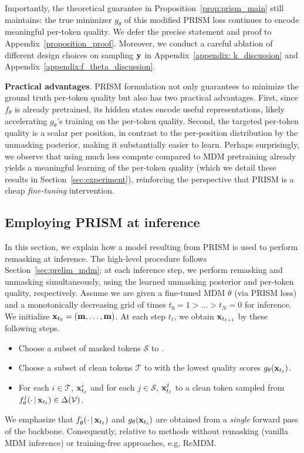 Importantly, the theoretical guarantee in Proposition~\ref{prop:prism_main} still maintains: the true minimizer $g_\theta$ of this modified PRISM loss continues to encode meaningful per-token quality. We defer the precise statement and proof to Appendix~\ref{proposition_proof}. Moreover, we conduct a careful ablation of different design choices on sampling ${\mathbf{y}}$ in Appendix~\ref{appendix: k_discussion} and Appendix~\ref{appendix:f_theta_discussion}.


\textbf{Practical advantages}. PRISM formulation not only guarantees to minimize the ground truth per-token quality but also has two practical advantages. First, since $f_\theta$ is already pretrained, its hidden states encode useful representations, likely accelerating $g_\theta$'s training on the per-token quality. Second, the targeted per-token quality is a scalar per position, in contrast to the per-position distribution by the unmasking posterior, making it substantially easier to learn. Perhaps surprisingly, we observe that using much less compute compared to MDM pretraining already yields a meaningful learning of the per-token quality (which we detail these results in Section~\ref{sec:experiment}), reinforcing the perspective that PRISM is a cheap \emph{fine-tuning} intervention.

\subsection{Employing PRISM at inference}\label{sec:prism_inference}
In this section, we explain how a model resulting from PRISM is used to perform remasking at inference. The high-level procedure follows Section~\ref{sec:prelim_mdm}; at each inference step, we perform remasking and unmasking simultaneously, using the learned unmasking posterior and per-token quality, respectively.  Assume we are given a fine-tuned MDM $\theta$ (via PRISM loss) and a monotonically decreasing grid of times $t_0=1>\dots>t_N = 0$ for inference. We initialize ${\mathbf{x}}_{t_0}=(\mathbf{m},\dots,\mathbf{m})$. At each step $t_\ell$, we obtain ${\mathbf{x}}_{t_{\ell+1}}$ by these following steps.
\begin{itemize}[leftmargin=17pt, noitemsep, parsep=3pt, topsep=0pt]
    \item[(a)] Choose a subset of masked tokens $\mathcal{S}$ to .
    \item[(b)] Choose a subset of clean tokens $\mathcal{T}$ to  with the lowest quality scores $g_\theta({\mathbf{x}}_{t_{\ell}})$.
    \item[(c)] For each $i\in\mathcal{T}$,  ${\mathbf{x}}_{t_\ell}^i$ and for each $j\in\mathcal{S}$,  ${\mathbf{x}}_{t_\ell}^j$ to a clean token sampled from $f_\theta^j(\cdot\,|\, {\mathbf{x}}_{t_\ell})\in\Delta(\mathcal{V})$.
\end{itemize}
We emphasize that $f_\theta^{\cdot}(\cdot\,|\,{\mathbf{x}}_{t_\ell})$ and $g_\theta({\mathbf{x}}_{t_{\ell}})$ are obtained from a \emph{single} forward pass of the backbone. Consequently,  relative to methods without remasking (vanilla MDM inference) or training-free approaches, e.g, ReMDM.

